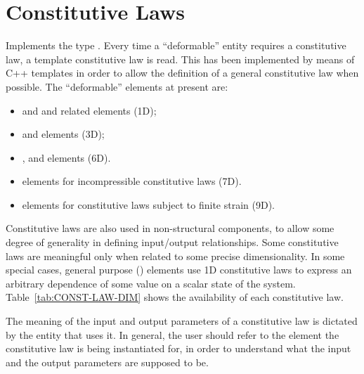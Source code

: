 \section{Constitutive Laws}\label{sec:ConstitutiveLaw}
Implements the type \texttt{}.
Every time a ``deformable'' entity requires a constitutive law, a template
constitutive law is read. This has been implemented by means of C++
templates in order to allow the definition of a general constitutive law
when possible.
The ``deformable'' elements at present are:
\begin{itemize}
\item {}
	and
	and related elements (1D);
\item {}
	and 
	elements (3D);
\item {},  and 
        elements (6D).
\item {}
  elements for incompressible constitutive laws (7D).
\item {}
	elements for constitutive laws subject to finite strain (9D).
\end{itemize}

Constitutive laws are also used in non-structural components,
to allow some degree of generality in defining input/output relationships.
Some constitutive laws are meaningful only when related to some precise
dimensionality. 
In some special cases, general purpose ()
elements use 1D constitutive laws to express an arbitrary dependence
of some value on a scalar state of the system.
Table~\ref{tab:CONST-LAW-DIM} shows the availability of each constitutive law.

The meaning of the input and output parameters of a constitutive law
is dictated by the entity that uses it.
In general, the user should refer to the element the constitutive law
is being instantiated for, in order to understand what the input
and the output parameters are supposed to be.

